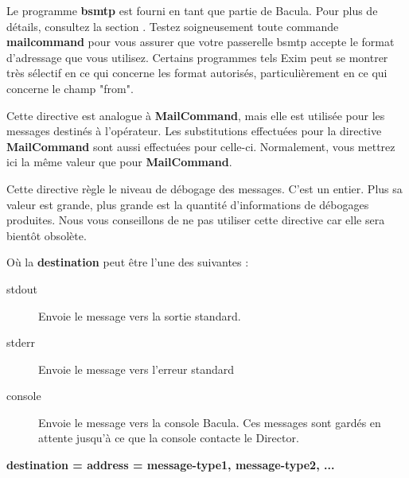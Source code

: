 \begin{description}
Le programme {\bf bsmtp} est fourni en tant que partie de Bacula. Pour plus 
de d\'etails, consultez la section . Testez soigneusement 
toute commande {\bf mailcommand} pour vous assurer que votre passerelle 
bsmtp accepte le format d'adressage que vous utilisez. Certains programmes 
tels Exim peut se montrer tr\`es s\'electif en ce qui concerne les format 
autoris\'es, particuli\`erement en ce qui concerne le champ "from".

\item [OperatorCommand = \lt{}command\gt{}]
   Cette directive est analogue \`a {\bf MailCommand}, mais elle est utilis\'ee pour 
   les messages destin\'es \`a l'op\'erateur. Les substitutions effectu\'ees pour la 
   directive {\bf MailCommand} sont aussi effectu\'ees pour celle-ci. Normalement, 
   vous mettrez ici la m\^eme valeur que pour {\bf MailCommand}.

\item [Debug = \lt{}debug-level\gt{}]
   Cette directive r\`egle le niveau de d\'ebogage des messages. C'est un entier. 
   Plus sa valeur est grande, plus grande est la quantit\'e d'informations de 
   d\'ebogages produites. Nous vous conseillons de ne pas utiliser cette directive 
   car elle sera bient\^ot obsol\`ete.

\item [\lt{}destination\gt{} = \lt{}message-type1\gt{},
   \lt{}message-type2\gt{}, ...]

O\`u la {\bf destination} peut \^etre l'une des suivantes :

\begin{description}

\item [stdout]
   Envoie le message vers la sortie standard.

\item [stderr]
   Envoie le message vers l'erreur standard

\item [console]
   Envoie le message vers la console Bacula. Ces messages sont gard\'es en attente 
   jusqu'\`a ce que la console contacte le Director.
\end{description}

\item {\bf \lt{}destination\gt{} = \lt{}address\gt{} =
   \lt{}message-type1\gt{}, \lt{}message-type2\gt{}, ...}


\end{description}
